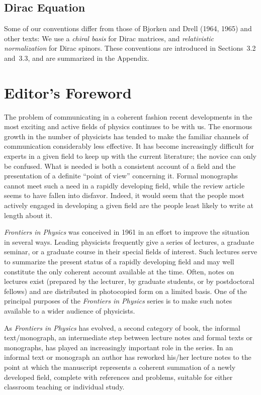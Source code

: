 \section*{Dirac Equation}

Some of our conventions differ from those of Bjorken and Drell (1964,
1965) and other texts: We use a \emph{chiral basis} for Dirac matrices,
and \emph{relativistic normalization} for Dirac spinors.  These
conventions are introduced in Sections~3.2 and~3.3, and are summarized in
the Appendix.

\chapter*{Editor's Foreword}

The problem of communicating in a coherent fashion recent developments in
the most exciting and active fields of physics continues to be with us.
The enormous growth in the number of physicists has tended to make the
familiar channels of communication considerably less effective.  It has
become increasingly difficult for experts in a given field to keep up with
the current literature; the novice can only be confused.  What is needed
is both a consistent account of a field and the presentation of a definite
``point of view'' concerning it.  Formal monographs cannot meet such a need
in a rapidly developing field, while the review article seems to have
fallen into disfavor.  Indeed, it would seem that the people most actively
engaged in developing a given field are the people least likely to write
at length about it.

\textit{Frontiers in Physics} was conceived in 1961 in an effort to
improve the situation in several ways.  Leading physicists frequently give
a series of lectures, a graduate seminar, or a graduate course in their
special fields of interest.  Such lectures serve to summarize the present
status of a rapidly developing field and may well constitute the only
coherent account available at the time.  Often, notes on lectures exist
(prepared by the lecturer, by graduate students, or by postdoctoral
fellows) and are distributed in photocopied form on a limited basis.  One
of the principal purposes of the \textit{Frontiers in Physics} series is
to make such notes available to a wider audience of physicists.

As \textit{Frontiers in Physics} has evolved, a second category of book,
the informal text/monograph, an intermediate step between lecture notes
and formal texts or monographs, has played an increasingly important role
in the series.  In an informal text or monograph an author has reworked
his/her lecture notes to the point at which the manuscript represents a
coherent summation of a newly developed field, complete with references
and problems, suitable for either classroom teaching or individual study.

